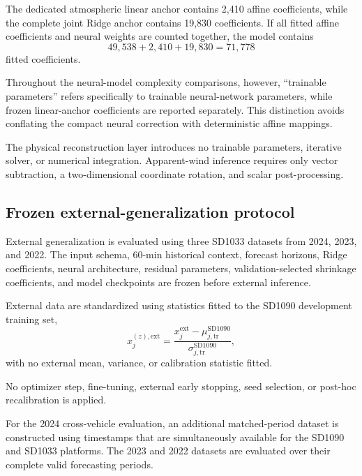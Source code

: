 The dedicated atmospheric linear anchor contains 2,410 affine coefficients, while the complete joint Ridge anchor contains 19,830 coefficients. If all fitted affine coefficients and neural weights are counted together, the model contains
\begin{equation}
49{,}538
+
2{,}410
+
19{,}830
=
\boxed{
71{,}778
}
\label{eq:total_fitted_coefficients}
\end{equation}
fitted coefficients.

Throughout the neural-model complexity comparisons, however, ``trainable parameters'' refers specifically to trainable neural-network parameters, while frozen linear-anchor coefficients are reported separately. This distinction avoids conflating the compact neural correction with deterministic affine mappings.

The physical reconstruction layer introduces no trainable parameters, iterative solver, or numerical integration. Apparent-wind inference requires only vector subtraction, a two-dimensional coordinate rotation, and scalar post-processing.

\subsection{Frozen external-generalization protocol}
\label{subsec:external_protocol}

External generalization is evaluated using three SD1033 datasets from 2024, 2023, and 2022. The input schema, 60-min historical context, forecast horizons, Ridge coefficients, neural architecture, residual parameters, validation-selected shrinkage coefficients, and model checkpoints are frozen before external inference.

External data are standardized using statistics fitted to the SD1090 development training set,
\begin{equation}
x_j^{(z),\mathrm{ext}}
=
\frac{
x_j^{\mathrm{ext}}
-
\mu_{j,\mathrm{tr}}^{\mathrm{SD1090}}
}{
\sigma_{j,\mathrm{tr}}^{\mathrm{SD1090}}
},
\label{eq:external_standardization}
\end{equation}
with no external mean, variance, or calibration statistic fitted.

No optimizer step, fine-tuning, external early stopping, seed selection, or post-hoc recalibration is applied.

For the 2024 cross-vehicle evaluation, an additional matched-period dataset is constructed using timestamps that are simultaneously available for the SD1090 and SD1033 platforms. The 2023 and 2022 datasets are evaluated over their complete valid forecasting periods.

